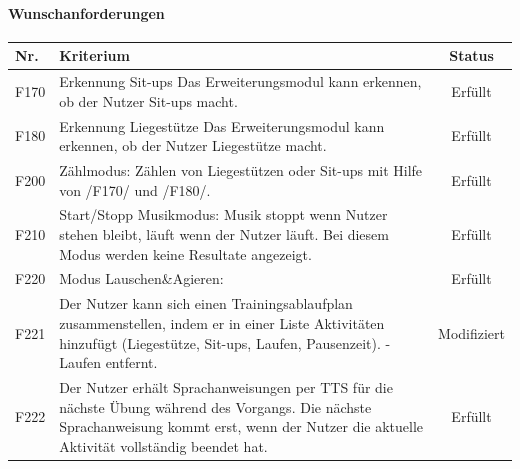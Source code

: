 \documentclass[a4paper,12pt]{article}
\begin{document}
\paragraph{Wunschanforderungen}
\begin{center}
	\begin{tabular}{ |m{1cm}| m{11cm} | c | } 
		\hline
		\textbf{Nr.} & \textbf{Kriterium} & \textbf{Status}

	\\  \hline   F170 & \textsf{Erkennung Sit-ups} Das Erweiterungsmodul kann erkennen, ob der Nutzer Sit-ups macht.
	&    \cellcolor{green!25} Erfüllt 
	\\  \hline   F180 & \textsf{Erkennung Liegestütze} Das Erweiterungsmodul kann erkennen, ob der Nutzer Liegestütze macht.
	&    \cellcolor{green!25} Erfüllt 
	\\  \hline   F200 & \textsf{Zählmodus:} Zählen von Liegestützen oder Sit-ups mit Hilfe von /F170/ und /F180/.
	&    \cellcolor{green!25} Erfüllt 
	\\  \hline   F210 & \textsf{Start/Stopp Musikmodus:} Musik stoppt wenn Nutzer stehen bleibt, läuft wenn der Nutzer läuft. Bei diesem Modus werden keine Resultate angezeigt.
	&    \cellcolor{green!25} Erfüllt 
	\\  \hline   F220 & \textsf{Modus \glqq Lauschen\&Agieren\grqq:}
	&    \cellcolor{green!25} Erfüllt 
	\\  \hline   F221 &Der Nutzer kann sich einen Trainingsablaufplan zusammenstellen, indem er in einer Liste Aktivitäten hinzufügt (Liegestütze, Sit-ups, Laufen, Pausenzeit). - Laufen entfernt.
	&    \cellcolor{blue!25} Modifiziert 
	\\  \hline   F222 & Der Nutzer erhält Sprachanweisungen per TTS für die nächste Übung während des Vorgangs. Die nächste Sprachanweisung kommt erst, wenn der Nutzer die aktuelle Aktivität vollständig beendet hat.
	&    \cellcolor{green!25} Erfüllt 
	\\
	\hline
		
   
\end{tabular}
\end{center}
\vspace{1cm}
\end{document}
